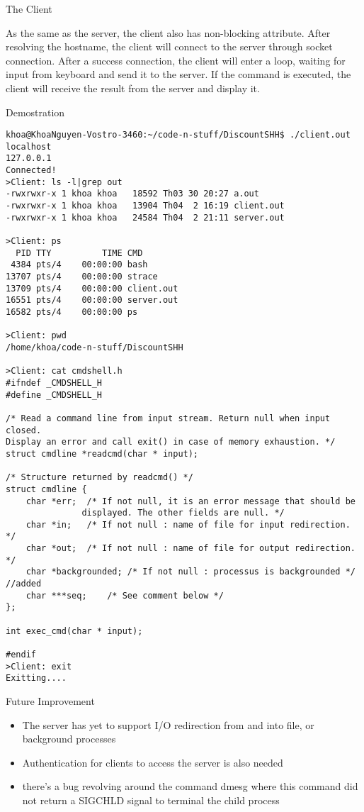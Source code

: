 \documentclass{report}
\begin{document}
\begin{section}{The Client}

As the same as the server, the client also has non-blocking attribute. After resolving the hostname, the client will connect to the server through socket connection. After a success connection, the client will enter a loop, waiting for input from keyboard and send it to the server. If the command is executed, the client will receive the result from the server and display it.
\end{section}

\begin{section}{Demostration}
\begin{verbatim}
khoa@KhoaNguyen-Vostro-3460:~/code-n-stuff/DiscountSHH$ ./client.out localhost
127.0.0.1
Connected!
>Client: ls -l|grep out 
-rwxrwxr-x 1 khoa khoa   18592 Th03 30 20:27 a.out
-rwxrwxr-x 1 khoa khoa   13904 Th04  2 16:19 client.out
-rwxrwxr-x 1 khoa khoa   24584 Th04  2 21:11 server.out

>Client: ps
  PID TTY          TIME CMD
 4384 pts/4    00:00:00 bash
13707 pts/4    00:00:00 strace
13709 pts/4    00:00:00 client.out
16551 pts/4    00:00:00 server.out
16582 pts/4    00:00:00 ps

>Client: pwd       
/home/khoa/code-n-stuff/DiscountSHH

>Client: cat cmdshell.h
#ifndef _CMDSHELL_H
#define _CMDSHELL_H

/* Read a command line from input stream. Return null when input closed.
Display an error and call exit() in case of memory exhaustion. */
struct cmdline *readcmd(char * input);

/* Structure returned by readcmd() */
struct cmdline {
	char *err;	/* If not null, it is an error message that should be
			   displayed. The other fields are null. */
	char *in;	/* If not null : name of file for input redirection. */
	char *out;	/* If not null : name of file for output redirection. */
	char *backgrounded; /* If not null : processus is backgrounded */       //added
	char ***seq;	/* See comment below */
};

int exec_cmd(char * input);

#endif
>Client: exit
Exitting....

\end{verbatim}
\end{section}

\begin{section}{Future Improvement}
\begin{itemize}
	\item The server has yet to support I/O redirection from and into file, or background processes
	\item Authentication for clients to access the server is also needed
	\item there's a bug revolving around the command dmesg where this command did not return a SIGCHLD signal to terminal the child process
\end{itemize}
\end{section}
\end{document}
